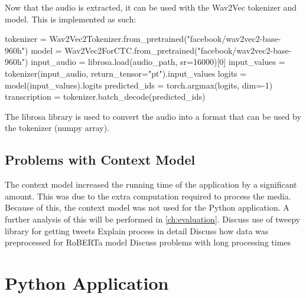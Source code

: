 Now that the audio is extracted, it can be used with the Wav2Vec tokenizer and model. This is implemented as such:
\begin{algorithm}
    \begin{algorithmic}
        \STATE tokenizer = Wav2Vec2Tokenizer.from\_pretrained("facebook/wav2vec2-base-960h")
        \STATE model = Wav2Vec2ForCTC.from\_pretrained("facebook/wav2vec2-base-960h")
        \STATE input\_audio = librosa.load(audio\_path, sr=16000)[0]
        \STATE input\_values = tokenizer(input\_audio, return\_tensor="pt").input\_values
        \STATE logits = model(input\_values).logits
        \STATE predicted\_ids = torch.argmax(logits, dim=-1)
        \STATE transcription = tokenizer.batch\_decode(predicted\_ids)
    \end{algorithmic}
\end{algorithm}

The librosa library is used to convert the audio into a format that can be used by the tokenizer (numpy array).
\subsection{Problems with Context Model}
The context model increased the running time of the application by a significant amount. This was due to the extra computation required to process the media.
Because of this, the context model was not used for the Python application. A further analysis of this will be performed in \cref{ch:evaluation}.
Discuss use of tweepy library for getting tweets
Explain process in detail
Discuss how data was preprocessed for RoBERTa model
Discuss problems with long processing times
\section{Python Application}
